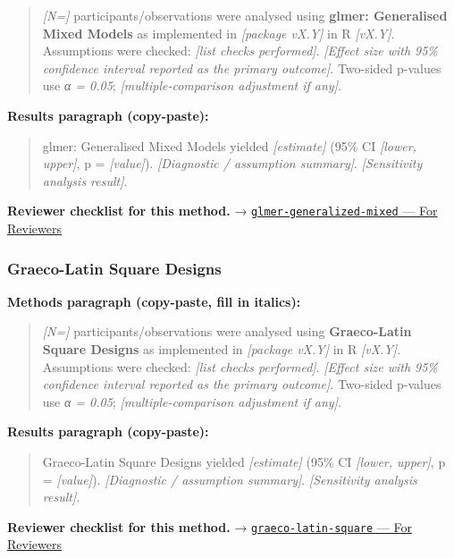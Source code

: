\documentclass[
]{article}
\begin{document}
\begin{quote}
\emph{{[}N={]}} participants/observations were analysed using
\textbf{glmer: Generalised Mixed Models} as implemented in
\emph{{[}package vX.Y{]}} in R \emph{{[}vX.Y{]}}. Assumptions were
checked: \emph{{[}list checks performed{]}}. \emph{{[}Effect size with
95\% confidence interval reported as the primary outcome{]}}. Two-sided
p-values use \emph{α = 0.05}; \emph{{[}multiple-comparison adjustment if
any{]}}.
\end{quote}

\textbf{Results paragraph (copy-paste):}

\begin{quote}
glmer: Generalised Mixed Models yielded \emph{{[}estimate{]}} (95\% CI
\emph{{[}lower, upper{]}}, p = \emph{{[}value{]}}). \emph{{[}Diagnostic
/ assumption summary{]}}. \emph{{[}Sensitivity analysis result{]}}.
\end{quote}

\textbf{Reviewer checklist for this method.} →
\href{../chapters/07-regression/glmer-generalized-mixed.Rmd\#for-reviewers}{\texttt{glmer-generalized-mixed}
--- For Reviewers}

\subsubsection{Graeco-Latin Square
Designs}\label{graeco-latin-square-designs}

\textbf{Methods paragraph (copy-paste, fill in italics):}

\begin{quote}
\emph{{[}N={]}} participants/observations were analysed using
\textbf{Graeco-Latin Square Designs} as implemented in \emph{{[}package
vX.Y{]}} in R \emph{{[}vX.Y{]}}. Assumptions were checked: \emph{{[}list
checks performed{]}}. \emph{{[}Effect size with 95\% confidence interval
reported as the primary outcome{]}}. Two-sided p-values use \emph{α =
0.05}; \emph{{[}multiple-comparison adjustment if any{]}}.
\end{quote}

\textbf{Results paragraph (copy-paste):}

\begin{quote}
Graeco-Latin Square Designs yielded \emph{{[}estimate{]}} (95\% CI
\emph{{[}lower, upper{]}}, p = \emph{{[}value{]}}). \emph{{[}Diagnostic
/ assumption summary{]}}. \emph{{[}Sensitivity analysis result{]}}.
\end{quote}

\textbf{Reviewer checklist for this method.} →
\href{../chapters/16-design/graeco-latin-square.Rmd\#for-reviewers}{\texttt{graeco-latin-square}
--- For Reviewers}
\end{document}

